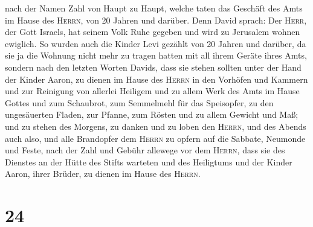 nach der Namen Zahl von Haupt zu Haupt, welche taten das Geschäft des
Amts im Hause des \textsc{Herrn}, von 20 Jahren und darüber.
 Denn David sprach: Der \textsc{Herr}, der Gott Israels,
hat seinem Volk Ruhe gegeben und wird zu Jerusalem wohnen ewiglich.
 So wurden auch die Kinder Levi gezählt von 20 Jahren und
darüber, da sie ja die Wohnung nicht mehr zu tragen hatten mit all ihrem
Geräte ihres Amts,  sondern nach den letzten Worten
Davids,  dass sie stehen sollten unter der Hand der
Kinder Aaron, zu dienen im Hause des \textsc{Herrn} in den Vorhöfen und
Kammern und zur Reinigung von allerlei Heiligem und zu allem Werk des
Amts im Hause Gottes  und zum Schaubrot, zum Semmelmehl
für das Speisopfer, zu den ungesäuerten Fladen, zur Pfanne, zum Rösten
und zu allem Gewicht und Maß;  und zu stehen des Morgens,
zu danken und zu loben den \textsc{Herrn}, und des Abends auch also,
 und alle Brandopfer dem \textsc{Herrn} zu opfern auf die
Sabbate, Neumonde und Feste, nach der Zahl und Gebühr allewege vor dem
\textsc{Herrn},  dass sie des Dienstes an der Hütte des
Stifts warteten und des Heiligtums und der Kinder Aaron, ihrer Brüder,
zu dienen im Hause des \textsc{Herrn}.

\hypertarget{section-23}{%
\section{24}\label{section-23}}

